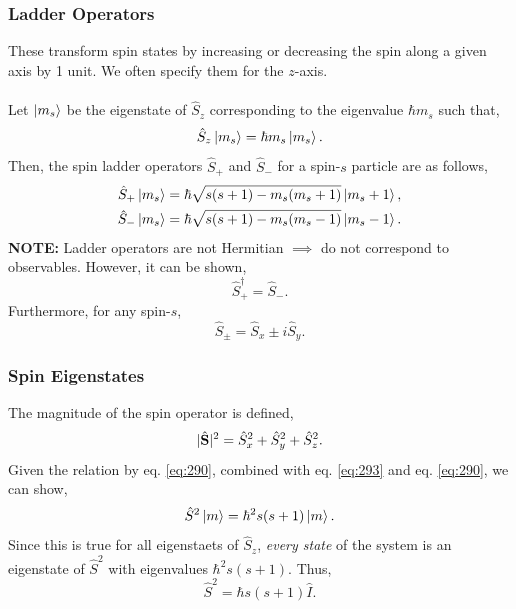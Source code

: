 \documentclass{book}
\begin{document}
\subsubsection{Ladder Operators}
These transform spin states by increasing or decreasing the spin along a given axis by 1 unit. We often specify them for the $z$-axis.
\\\\
Let $\ket{m_s}$ be the eigenstate of $\hat{S}_z$ corresponding to the eigenvalue $\hbar m_s$ such that,
\begin{equation}
	\hat{S}_z \ket{m_s} = \hbar m_s \ket{m_s}.
\end{equation}
Then, the spin ladder operators $\hat{S}_+$ and $\hat{S}_-$ for a spin-$s$ particle are as follows,
\begin{align}
		\hat{S}_+ \ket{m_s} = \hbar\sqrt{s(s+1) - m_s(m_s + 1)}\ket{m_s + 1}, \\
		\hat{S}_- \ket{m_s} = \hbar\sqrt{s(s+1) - m_s(m_s - 1)}\ket{m_s - 1}. \label{eq:293}
\end{align}
\textbf{NOTE:} Ladder operators are not Hermitian $\implies$ do not correspond to observables. However, it can be shown,
\begin{equation}
	\hat{S}_+^{\dag} = \hat{S}_-.
\end{equation}
Furthermore, for any spin-$s$,
\begin{equation}
	\hat{S}_{\pm} = \hat{S}_x \pm i\hat{S}_y. \label{eq:290}
\end{equation}
\subsubsection{Spin Eigenstates}
The magnitude of the spin operator is defined,
\begin{equation}
	|\hat{\vb{S}}|^2 = \hat{S}_x^2 + \hat{S}_y^2 + \hat{S}_z^2. \label{eq:129}
\end{equation}
Given the relation by eq. \eqref{eq:290}, combined with eq. \eqref{eq:293} and eq. \eqref{eq:290}, we can show,
\begin{equation}
	\hat{S}^2 \ket{m} = \hbar^2s(s+1)\ket{m}.
\end{equation}
Since this is true for all eigenstaets of $\hat{S}_z$, \textit{every state} of the system is an eigenstate of $\hat{S}^2$ with eigenvalues $\hbar^2s(s+1)$. Thus,
\begin{equation}
	\hat{S}^2 = \hbar s(s+1)\hat{I}.
\end{equation}
\end{document}
